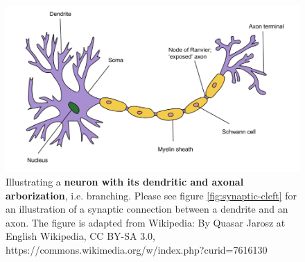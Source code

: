 \begin{figure}
    \centering
    \includegraphics[width=12cm]{fig/neuron-figure-wikipedia}
    \caption{Illustrating a \textbf{neuron with its dendritic and axonal arborization}, i.e. branching. Please see figure \ref{fig:synaptic-cleft} for an illustration of a synaptic connection between a dendrite and an axon.
    The figure is adapted from Wikipedia: By Quasar Jarosz at English Wikipedia, CC BY-SA 3.0, https://commons.wikimedia.org/w/index.php?curid=7616130}
    \label{fig:neurons-synapses}
\end{figure}

